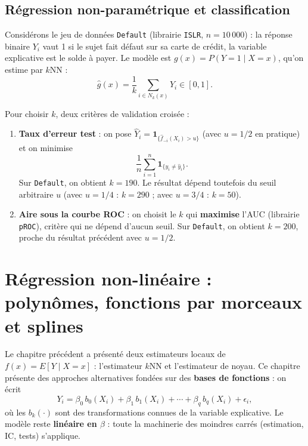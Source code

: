 \documentclass[
  french,
  letterpaper,
  DIV=11,
  numbers=noendperiod]{scrreprt}
\begin{document}
\section{Régression non-paramétrique et
classification}\label{ruxe9gression-non-paramuxe9trique-et-classification}

Considérons le jeu de données \texttt{Default} (librairie \texttt{ISLR},
\(n = 10\,000\)) : la réponse binaire \(Y_i\) vaut 1 si le sujet fait
défaut sur sa carte de crédit, la variable explicative est le solde à
payer. Le modèle est \(g(x) = P(Y = 1\mid X = x)\), qu'on estime par
\(k\)NN : \[\hat g(x) = \frac{1}{k}\sum_{i\in N_k(x)}Y_i \in [0,1].\]

Pour choisir \(k\), deux critères de validation croisée :

\begin{enumerate}
\def\labelenumi{\arabic{enumi}.}
\item
  \textbf{Taux d'erreur test} : on pose
  \(\hat Y_i = \mathbf{1}_{\{\hat f_{-i}(X_i) > u\}}\) (avec \(u = 1/2\)
  en pratique) et on minimise
  \[\frac{1}{n}\sum_{i=1}^n\mathbf{1}_{\{y_i\neq\hat y_i\}}.\] Sur
  \texttt{Default}, on obtient \(k = 190\). Le résultat dépend toutefois
  du seuil arbitraire \(u\) (avec \(u = 1/4\) : \(k = 290\) ; avec
  \(u = 3/4\) : \(k = 50\)).
\item
  \textbf{Aire sous la courbe ROC} : on choisit le \(k\) qui
  \textbf{maximise} l'AUC (librairie \texttt{pROC}), critère qui ne
  dépend d'aucun seuil. Sur \texttt{Default}, on obtient \(k = 200\),
  proche du résultat précédent avec \(u = 1/2\).
\end{enumerate}


\chapter{Régression non-linéaire : polynômes, fonctions par morceaux et
splines}\label{sec-splines}

Le chapitre précédent a présenté deux estimateurs locaux de
\(f(x) = E[Y\mid X=x]\) : l'estimateur \(k\)NN et l'estimateur de noyau.
Ce chapitre présente des approches alternatives fondées sur des
\textbf{bases de fonctions} : on écrit
\[Y_i = \beta_0\, b_0(X_i) + \beta_1\, b_1(X_i) + \cdots + \beta_q\, b_q(X_i) + \epsilon_i,\]
où les \(b_k(\cdot)\) sont des transformations connues de la variable
explicative. Le modèle reste \textbf{linéaire en \(\beta\)} : toute la
machinerie des moindres carrés (estimation, IC, tests) s'applique.
\end{document}
